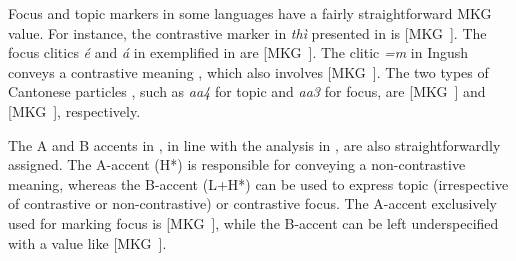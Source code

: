 Focus and topic markers in some languages have a fairly
straightforward MKG value. For instance, the contrastive  marker
in  \textit{th{\`i}} presented in 
is \mbox{[MKG ]}.  The focus clitics \textit{{\'e}} and
\textit{{\'a}} in  exemplified in  are
\mbox{[MKG ]}. The clitic \textit{=m} in Ingush conveys a
contrastive  meaning , which also
involves \mbox{[MKG ]}. The two types of Cantonese
particles , such as \textit{aa4} for topic and
\textit{aa3} for focus, are \mbox{[MKG ]} and \mbox{[MKG
    ]}, respectively.


The A and B accents in , in line with the analysis in
\citet{hedberg:06}, are also straightforwardly assigned. The A-accent
(H*) is responsible for conveying a non-contrastive  meaning,
whereas the B-accent (L+H*) can be used to express topic (irrespective
of contrastive or non-contrastive) or contrastive focus.
 The A-accent exclusively used for marking
focus is \mbox{[MKG ]}, while the B-accent can be left
underspecified with a value like \mbox{[MKG ]}.




